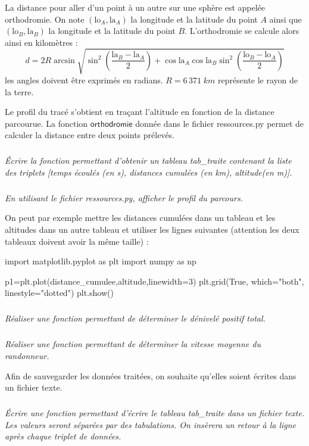 \documentclass[10pt,oneside]{article}
\begin{document}
La distance pour aller d'un point à un autre sur une sphère est appelée orthodromie. On note $(\text{lo}_A,\text{la}_A)$ la longitude et la latitude du point $A$ ainsi que $(\text{lo}_B,\text{la}_B)$ la longitude et la latitude du point $B$. L'orthodromie se calcule alors ainsi en kilomètres : 
$$
d = 2R\arcsin \sqrt{\sin^2\left( \dfrac{\text{la}_B-\text{la}_A}{2}\right) + \cos \text{la}_A \cos \text{la}_B \sin^2\left( \dfrac{\text{lo}_B-\text{lo}_A}{2}\right)}
$$
les angles doivent être exprimés en radians. $R=6\,371\; km$ représente le rayon de la terre.

Le profil du tracé s'obtient en traçant l'altitude en fonction de la distance parcourue. La fonction $\textsf{orthodromie}$ donnée dans le fichier \textsf{ressources.py} permet de calculer la distance entre deux points prélevés.

\subparagraph{}
\textit{Écrire la fonction permettant d'obtenir un tableau \textsf{tab\_traite} contenant la liste des triplets \textsf{[temps écoulés (en s), distances cumulées (en km), altitude(en m)]}.}


\subparagraph{}
\textit{En utilisant le fichier \textsf{ressources.py}, afficher le profil du parcours.}


\begin{py}
On peut par exemple mettre les distances cumulées dans un tableau et les altitudes dans un autre tableau et utiliser les lignes suivantes (attention les deux tableaux doivent avoir la même taille) :
\end{py}

\begin{py}
\begin{python}
import matplotlib.pyplot as plt
import numpy as np

p1=plt.plot(distance_cumulee,altitude,linewidth=3)
plt.grid(True, which="both", linestyle="dotted")
plt.show()
\end{python}
\end{py}

\subparagraph{}
\textit{Réaliser une fonction permettant de déterminer le dénivelé positif total.}

\subparagraph{}
\textit{Réaliser une fonction permettant de déterminer la vitesse moyenne du randonneur.}

Afin de sauvegarder les données traitées, on souhaite qu'elles soient écrites dans un fichier texte.

\subparagraph{}
\textit{Écrire une fonction permettant d'écrire le tableau \textsf{tab\_traite} dans un fichier texte. Les valeurs seront séparées par des tabulations. On insèrera un retour à la ligne après chaque triplet de données.}
\end{document}
